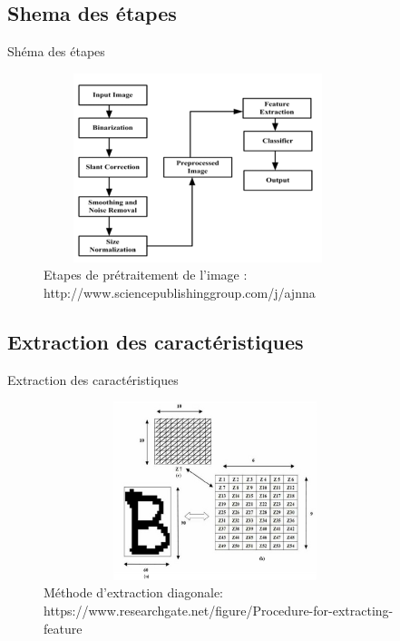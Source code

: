 \documentclass{beamer}
\begin{document}
\subsection{Shema des étapes}
\begin{frame}{Shéma des étapes} 
\begin{figure}[H]
    \includegraphics[width=9cm,height=5.5cm]{images/pretraitement.png}
    \caption{Etapes de prétraitement de l’image : http://www.sciencepublishinggroup.com/j/ajnna}
    \label{fig:L1}
\end{figure}
\end{frame}
\subsection{Extraction des caractéristiques}
\begin{frame}{Extraction des caractéristiques} 
\begin{figure}[H]
    \includegraphics[width=10cm,height=5.2cm]{images/diagonal_methode.png}
    \caption{Méthode d'extraction diagonale: https://www.researchgate.net/figure/Procedure-for-extracting-feature}
    \label{fig:L1}
\end{figure}
\end{frame}
\end{document}
